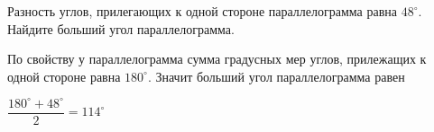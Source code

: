  Разность углов, прилегающих к одной стороне параллелограмма равна $48^{\circ}$. Найдите больший угол параллелограмма.\\
\begin{figure}[h]
\end{figure}
\Solution По свойству у параллелограмма сумма градусных мер углов, прилежащих к одной стороне равна $180^{\circ}$. Значит больший угол параллелограмма равен 
\begin{center}$\dfrac{180^{\circ}+48^{\circ}}{2}=114^{\circ}$
\end{center}

